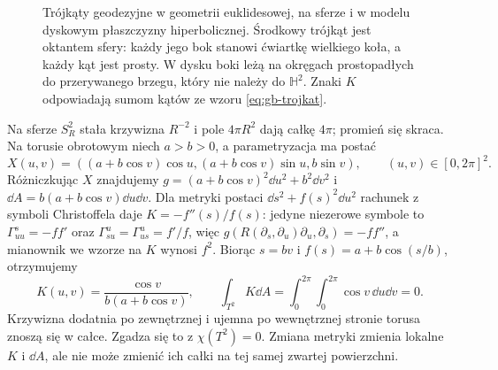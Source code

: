 \begin{figure}[H]
\caption{Trójkąty geodezyjne w geometrii euklidesowej,
na sferze i w modelu dyskowym płaszczyzny hiperbolicznej.
Środkowy trójkąt jest oktantem sfery: każdy jego bok
stanowi ćwiartkę wielkiego koła, a każdy kąt jest prosty.
W dysku boki leżą na okręgach prostopadłych do
przerywanego brzegu, który nie należy do $\mathbb H^2$.
Znaki $K$ odpowiadają sumom kątów ze wzoru
\eqref{eq:gb-trojkat}.}
\label{fig:gb-trojkaty-modele}
\end{figure}

\begin{przyklad}
\label{prz:gb-sfera-torus}
Na sferze $S_R^2$ stała krzywizna $R^{-2}$ i pole
$4\pi R^2$ dają całkę $4\pi$; promień się skraca.
Na torusie obrotowym niech $a>b>0$, a parametryzacja
ma postać
\[
 X(u,v)=((a+b\cos v)\cos u,
          (a+b\cos v)\sin u,b\sin v),
 \qquad (u,v)\in[0,2\pi]^2.
\]
Różniczkując $X$ znajdujemy
$g=(a+b\cos v)^2\dd u^2+b^2\dd v^2$ i
$\dd A=b(a+b\cos v)\dd u\dd v$.
Dla metryki postaci $\dd s^2+f(s)^2\dd u^2$
rachunek z symboli Christoffela daje
$K=-f''(s)/f(s)$: jedyne niezerowe symbole to
$\Gamma^s_{uu}=-ff'$ oraz
$\Gamma^u_{su}=\Gamma^u_{us}=f'/f$, więc
$g(R(\partial_s,\partial_u)\partial_u,\partial_s)
=-ff''$, a mianownik we wzorze na $K$ wynosi $f^2$.
Biorąc $s=bv$ i $f(s)=a+b\cos(s/b)$, otrzymujemy
\[
 K(u,v)=\frac{\cos v}{b(a+b\cos v)},\qquad
 \int_{T^2}K\dd A
 =\int_0^{2\pi}\!\int_0^{2\pi}\cos v\,\dd u\dd v=0.
\]
Krzywizna dodatnia po zewnętrznej i ujemna po
wewnętrznej stronie torusa znoszą się w całce.
Zgadza się to z $\chi(T^2)=0$. Zmiana metryki
zmienia lokalne $K$ i $\dd A$, ale nie może zmienić
ich całki na tej samej zwartej powierzchni.
\end{przyklad}

